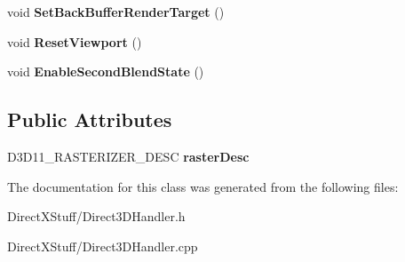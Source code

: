 \begin{DoxyCompactItemize}
\item 
\hypertarget{class_direct3_d_handler_a4ad60c8885afba8c5559b046ac3e46b3}{void {\bfseries Set\-Back\-Buffer\-Render\-Target} ()}\label{class_direct3_d_handler_a4ad60c8885afba8c5559b046ac3e46b3}

\item 
\hypertarget{class_direct3_d_handler_a57f6f9963318415319e17d9059398e3e}{void {\bfseries Reset\-Viewport} ()}\label{class_direct3_d_handler_a57f6f9963318415319e17d9059398e3e}

\item 
\hypertarget{class_direct3_d_handler_a29aa30262900bc39c26ea5947db0c884}{void {\bfseries Enable\-Second\-Blend\-State} ()}\label{class_direct3_d_handler_a29aa30262900bc39c26ea5947db0c884}

\end{DoxyCompactItemize}
\subsection*{Public Attributes}
\begin{DoxyCompactItemize}
\item 
\hypertarget{class_direct3_d_handler_aa7e547a0e9c64af134eb8f38374f49d6}{D3\-D11\-\_\-\-R\-A\-S\-T\-E\-R\-I\-Z\-E\-R\-\_\-\-D\-E\-S\-C {\bfseries raster\-Desc}}\label{class_direct3_d_handler_aa7e547a0e9c64af134eb8f38374f49d6}

\end{DoxyCompactItemize}


The documentation for this class was generated from the following files\-:\begin{DoxyCompactItemize}
\item 
Direct\-X\-Stuff/Direct3\-D\-Handler.\-h\item 
Direct\-X\-Stuff/Direct3\-D\-Handler.\-cpp\end{DoxyCompactItemize}
